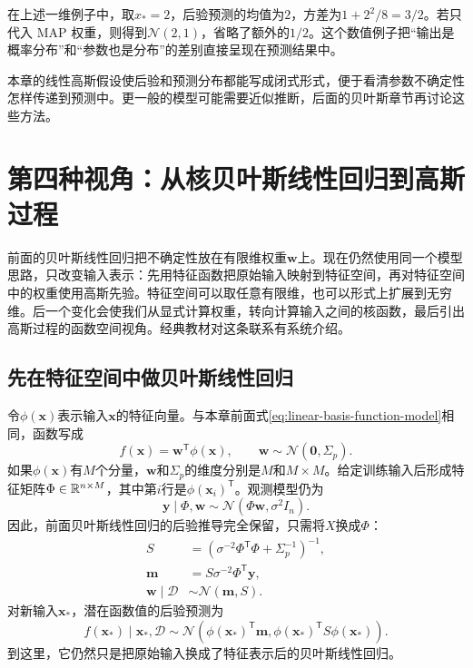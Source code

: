 在上述一维例子中，取$x_*=2$，后验预测的均值为$2$，方差为$1+2^2/8=3/2$。若只代入 MAP 权重，则得到$\mathcal N(2,1)$，省略了额外的$1/2$。这个数值例子把“输出是概率分布”和“参数也是分布”的差别直接呈现在预测结果中。

本章的线性高斯假设使后验和预测分布都能写成闭式形式，便于看清参数不确定性怎样传递到预测中。更一般的模型可能需要近似推断，后面的贝叶斯章节再讨论这些方法。

\section{第四种视角：从核贝叶斯线性回归到高斯过程}
\label{sec:gaussian-process-regression}
前面的贝叶斯线性回归把不确定性放在有限维权重$\bm w$上。现在仍然使用同一个模型思路，只改变输入表示：先用特征函数把原始输入映射到特征空间，再对特征空间中的权重使用高斯先验。特征空间可以取任意有限维，也可以形式上扩展到无穷维。后一个变化会使我们从显式计算权重，转向计算输入之间的核函数，最后引出高斯过程的函数空间视角。经典教材对这条联系有系统介绍\cite{rasmussen2006gpml}。

\subsection{先在特征空间中做贝叶斯线性回归}
令$\phi(\bm x)$表示输入$\bm x$的特征向量。与本章前面式\eqref{eq:linear-basis-function-model}相同，函数写成
\begin{equation}
 f(\bm x)=\bm w^{\mathsf T}\phi(\bm x),
 \qquad \bm w\sim\mathcal N(\bm0,\Sigma_p).
 \label{eq:kernel-bayesian-linear-model}
\end{equation}
如果$\phi(\bm x)$有$M$个分量，$\bm w$和$\Sigma_p$的维度分别是$M$和$M\times M$。给定训练输入后形成特征矩阵$\Phi\in\mathbb{R}^{n\times M}$，其中第$i$行是$\phi(\bm x_i)^{\mathsf T}$。观测模型仍为
\begin{equation}
 \bm y\mid\Phi,\bm w\sim\mathcal N(\Phi\bm w,\sigma^2I_n).
\end{equation}
因此，前面贝叶斯线性回归的后验推导完全保留，只需将$X$换成$\Phi$：
\begin{align}
 S&=\left(\sigma^{-2}\Phi^{\mathsf T}\Phi+\Sigma_p^{-1}\right)^{-1},\\
 \bm m&=S\sigma^{-2}\Phi^{\mathsf T}\bm y,\\
 \bm w\mid\mathcal D&\sim\mathcal N(\bm m,S).
 \label{eq:kernel-bayesian-linear-posterior}
\end{align}
对新输入$\bm x_*$，潜在函数值的后验预测为
\begin{equation}
 f(\bm x_*)\mid\bm x_*,\mathcal D
 \sim\mathcal N\left(\phi(\bm x_*)^{\mathsf T}\bm m,
 \phi(\bm x_*)^{\mathsf T}S\phi(\bm x_*)\right).
 \label{eq:kernel-bayesian-linear-prediction}
\end{equation}
到这里，它仍然只是把原始输入换成了特征表示后的贝叶斯线性回归。

